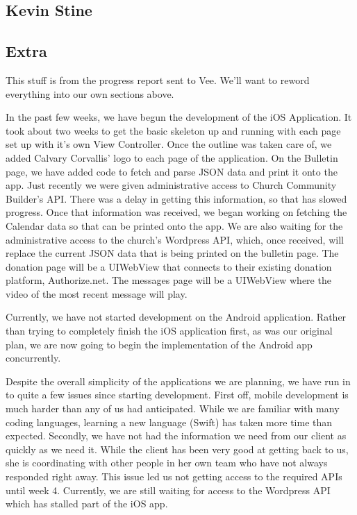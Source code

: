 \documentclass[letterpaper,10pt,draftclsnofoot,onecolumn,titlepage]{IEEEtran}
\begin{document}
	
	
	\subsection{Kevin Stine}
	
	
	
	\subsection{Extra}
	
	This stuff is from the progress report sent to Vee. We'll want to reword everything into our own sections above. 
	
		In the past few weeks, we have begun the development of the iOS Application. 
		It took about two weeks to get the basic skeleton up and running with each page set up with it's own View Controller. 
		Once the outline was taken care of, we added Calvary Corvallis' logo to each page of the application.
		On the Bulletin page, we have added code to fetch and parse JSON data and print it onto the app. 
		Just recently we were given administrative access to Church Community Builder's API. 
		There was a delay in getting this information, so that has slowed progress. 
		Once that information was received, we began working on fetching the Calendar data so that can be printed onto the app. 
		We are also waiting for the administrative access to the church's Wordpress API, which, once received, will replace the current JSON data that is being printed on the bulletin page. 
		The donation page will be a UIWebView that connects to their existing donation platform, Authorize.net. 
		The messages page will be a UIWebView where the video of the most recent message will play. 
		
		Currently, we have not started development on the Android application. 
		Rather than trying to completely finish the iOS application first, as was our original plan, we are now going to begin the implementation of the Android app concurrently. 
		
		Despite the overall simplicity of the applications we are planning, we have run in to quite a few issues since starting development. 
		First off, mobile development is much harder than any of us had anticipated. 
		While we are familiar with many coding languages, learning a new language (Swift) has taken more time than expected. 
		Secondly, we have not had the information we need from our client as quickly as we need it. 
		While the client has been very good at getting back to us, she is coordinating with other people in her own team who have not always responded right away. 
		This issue led us not getting access to the required APIs until week 4. 
		Currently, we are still waiting for access to the Wordpress API which has stalled part of the iOS app. 
		
\end{document}
